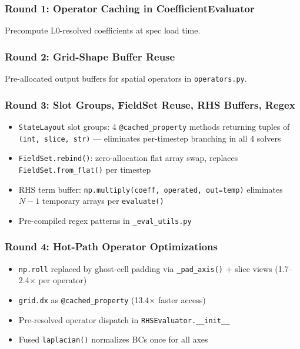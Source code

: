 \subsubsection{Round 1: Operator Caching in CoefficientEvaluator}
\label{sec:round1}

Precompute L0-resolved coefficients at spec load time.

\subsubsection{Round 2: Grid-Shape Buffer Reuse}
\label{sec:round2}

Pre-allocated output buffers for spatial operators in \texttt{operators.py}.

\subsubsection{Round 3: Slot Groups, FieldSet Reuse, RHS Buffers, Regex}
\label{sec:round3}

\begin{itemize}
  \item \texttt{StateLayout} slot groups: 4 \texttt{@cached\_property} methods returning tuples
    of \texttt{(int, slice, str)} --- eliminates per-timestep branching in all 4 solvers
  \item \texttt{FieldSet.rebind()}: zero-allocation flat array swap, replaces
    \texttt{FieldSet.from\_flat()} per timestep
  \item RHS term buffer: \texttt{np.multiply(coeff, operated, out=temp)} eliminates
    $N-1$ temporary arrays per \texttt{evaluate()}
  \item Pre-compiled regex patterns in \texttt{\_eval\_utils.py}
\end{itemize}

\subsubsection{Round 4: Hot-Path Operator Optimizations}
\label{sec:round4}

\begin{itemize}
  \item \texttt{np.roll} replaced by ghost-cell padding via \texttt{\_pad\_axis()} + slice views
    (1.7--2.4$\times$ per operator)
  \item \texttt{grid.dx} as \texttt{@cached\_property} (13.4$\times$ faster access)
  \item Pre-resolved operator dispatch in \texttt{RHSEvaluator.\_\_init\_\_}
  \item Fused \texttt{laplacian()} normalizes BCs once for all axes
\end{itemize}

